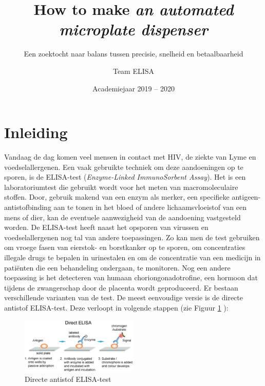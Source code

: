 \documentclass[a4paper,twoside,kulak]{kulakreport} %
\title{How to make \textit{an automated microplate dispenser}}
\subtitle{Een zoektocht naar balans tussen precisie, snelheid en betaalbaarheid}
\author{Team ELISA}
\institute{Matthias Derez, Maxime Dujardin, Korneel Verkens, Seppe Vilain}
\date{Academiejaar 2019 -- 2020}
\begin{document}

\titlepage

\tableofcontents

\chapter*{Inleiding}
Vandaag de dag komen veel mensen in contact met HIV, de ziekte van Lyme en voedselallergenen. Een vaak gebruikte techniek om deze aandoeningen op te sporen, is de ELISA-test\cite{wikipedia} (\textit{Enzyme-Linked ImmunoSorbent Assay}). Het is een laboratoriumtest die gebruikt wordt voor het meten van macromoleculaire stoffen. Door, gebruik makend van een enzym als merker, een specifieke antigeen-antistofbinding aan te tonen in het bloed of andere lichaamsvloeistof van een mens of dier, kan de eventuele aanwezigheid van de aandoening vastgesteld worden. De ELISA-test heeft naast het opsporen van virussen en voedselallergenen nog tal van andere toepassingen\cite{ELISAApplications}. Zo kan men de test gebruiken om vroege fasen van eierstok- en borstkanker op te sporen, om concentraties illegale drugs te bepalen in urinestalen en om de concentratie van een medicijn in patiënten die een behandeling ondergaan, te monitoren. Nog een andere toepassing is het detecteren van humaan choriongonadotrofine, een hormoon dat tijdens de zwangerschap door de placenta wordt geproduceerd\cite{HumanChorionicGonadotropin}. \newline
Er bestaan verschillende varianten van de test. De meest eenvoudige versie is de directe antistof ELISA-test. Deze verloopt in volgende stappen (zie Figuur \ref{fig: directe ELISA} \cite{AfbeeldingdirectELISA}):

\begin{figure}[h]
	\centering
	\includegraphics[width=0.5\textwidth]{ELISA.png}
	\caption{Directe antistof ELISA-test}
	\label{fig: directe ELISA}
	
\end{figure} 
\end{document}
